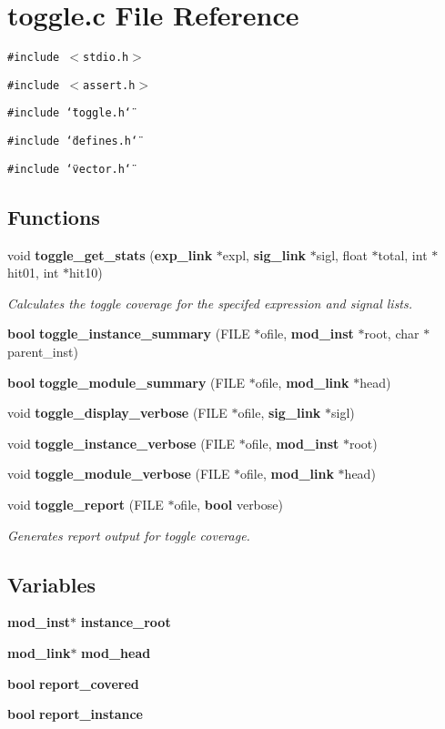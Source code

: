 \section{toggle.c File Reference}
\label{toggle_8c}
{\tt \#include $<$stdio.h$>$}\par
{\tt \#include $<$assert.h$>$}\par
{\tt \#include \char`\"{}toggle.h\char`\"{}}\par
{\tt \#include \char`\"{}defines.h\char`\"{}}\par
{\tt \#include \char`\"{}vector.h\char`\"{}}\par
\subsection*{Functions}
\begin{CompactItemize}
\item 
void {\bf toggle\_\-get\_\-stats} ({\bf exp\_\-link} $\ast$expl, {\bf sig\_\-link} $\ast$sigl, float $\ast$total, int $\ast$hit01, int $\ast$hit10)
\begin{CompactList}\small\item\em Calculates the toggle coverage for the specifed expression and signal lists.\item\end{CompactList}\item 
{\bf bool} {\bf toggle\_\-instance\_\-summary} (FILE $\ast$ofile, {\bf mod\_\-inst} $\ast$root, char $\ast$parent\_\-inst)
\item 
{\bf bool} {\bf toggle\_\-module\_\-summary} (FILE $\ast$ofile, {\bf mod\_\-link} $\ast$head)
\item 
void {\bf toggle\_\-display\_\-verbose} (FILE $\ast$ofile, {\bf sig\_\-link} $\ast$sigl)
\item 
void {\bf toggle\_\-instance\_\-verbose} (FILE $\ast$ofile, {\bf mod\_\-inst} $\ast$root)
\item 
void {\bf toggle\_\-module\_\-verbose} (FILE $\ast$ofile, {\bf mod\_\-link} $\ast$head)
\item 
void {\bf toggle\_\-report} (FILE $\ast$ofile, {\bf bool} verbose)
\begin{CompactList}\small\item\em Generates report output for toggle coverage.\item\end{CompactList}\end{CompactItemize}
\subsection*{Variables}
\begin{CompactItemize}
\item 
{\bf mod\_\-inst}$\ast$ {\bf instance\_\-root}
\item 
{\bf mod\_\-link}$\ast$ {\bf mod\_\-head}
\item 
{\bf bool} {\bf report\_\-covered}
\item 
{\bf bool} {\bf report\_\-instance}
\end{CompactItemize}


